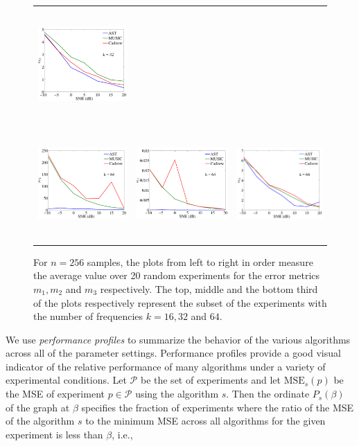 \begin{figure}[htbp]
\begin{tabular}{ccc}
	\includegraphics[height=43mm]{figures/mSNR3_32.pdf} \\
	\includegraphics[height=43mm]{figures/mSNR1_64.pdf} &
	\includegraphics[height=43mm]{figures/mSNR2_64.pdf} &
	\includegraphics[height=43mm]{figures/mSNR3_64.pdf}
\end{tabular}
\caption{For $n = 256$ samples, the plots from left to right in order measure the average value over 20 random experiments for the error metrics $m_1, m_2$ and $m_3$ respectively. The top, middle and the bottom third of the plots respectively represent the subset of the experiments
with the number of frequencies $k=16, 32$ and $64$.}
\label{fig:msnr}
\end{figure}


We use \emph{performance profiles} to summarize the behavior of the various
algorithms across all of the parameter settings. Performance profiles provide a
good visual indicator of the relative performance of many algorithms under a
variety of experimental conditions\cite{dolanmore02}. Let $\mathcal{P}$ be the
set of experiments and let $\mathrm{MSE}_s(p)$ be the MSE of experiment $p \in
\mathcal{P}$ using the algorithm $s$. Then the ordinate $P_s(\beta)$ of the
graph at $\beta$ specifies the fraction of experiments where the ratio of the
MSE of the algorithm $s$ to the minimum MSE across all algorithms for the given
experiment is less than $\beta$, i.e.,

